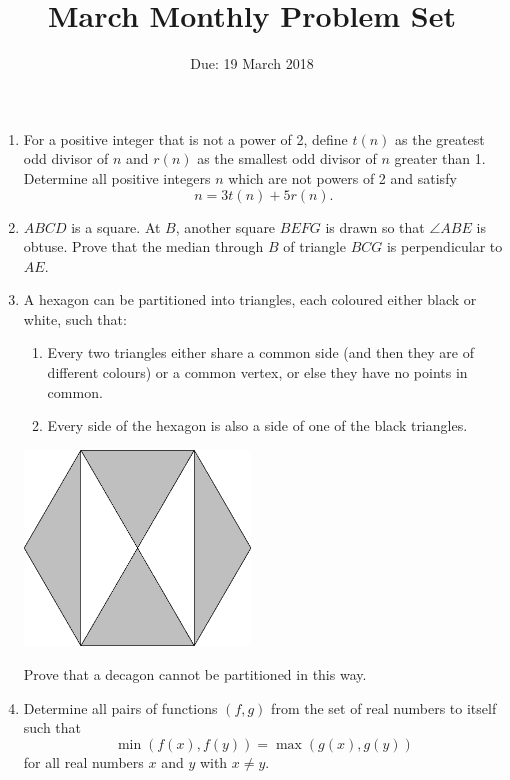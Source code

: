 \documentclass[12pt]{article}
\title{\vspace{-12pt}March Monthly Problem Set}
\author{Due: 19 March 2018}
\date{}
\begin{document}
 \maketitle \pagestyle{empty}

\begin{enumerate}

\item %
For a positive integer that is not a power of 2, define $t(n)$ as the greatest odd divisor of $n$ and $r(n)$ as the smallest odd divisor of $n$ greater than 1. Determine all positive integers $n$ which are not powers of 2 and satisfy
	\[ n = 3t(n)+5r(n).\]


\item %
$ABCD$ is a square. At $B$, another square $BEFG$ is drawn so that $\angle ABE$ is obtuse. Prove that the median through $B$ of triangle $BCG$ is perpendicular to $AE$.


\item %
A hexagon can be partitioned into triangles, each coloured either black or white, such that:
\begin{enumerate}
\item Every two triangles either share a common side (and then they are of different colours) or a common vertex, or else they have no points in common.
\item Every side of the hexagon is also a side of one of the black triangles.
\end{enumerate}

\begin{center}
    \includegraphics[width=6cm]{march_hexagon.eps}
\end{center}

Prove that a decagon cannot be partitioned in this way.


\item %
Determine all pairs of functions $(f,g)$ from the set of real numbers to itself such that
\[ \min(f(x),f(y)) = \max(g(x),g(y)) \]
for all real numbers $x$ and $y$ with $x \neq y$.



\end{enumerate}
\end{document}
